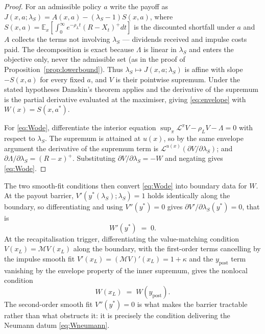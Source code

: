 \documentclass[11pt]{article}
\theoremstyle{remark}
\begin{document}
\begin{proof}
For an admissible policy $a$ write the payoff as
$J(x,a;\lambda_S) = A(x,a) - (\lambda_S-1)S(x,a)$, where
$S(x,a) = \mathbb{E}_x[\int_0^\infty e^{-\rho_L t}(R-X_t)^+dt]$ is the
discounted shortfall under $a$ and $A$ collects the terms not involving
$\lambda_S$ --- dividends received and impulse costs paid. The
decomposition is exact because $\Lambda$ is linear in $\lambda_S$ and
enters the objective only, never the admissible set (as in the proof of
Proposition~\ref{prop:lowerbound}). Thus $\lambda_S \mapsto J(x,a;\lambda_S)$
is affine with slope $-S(x,a)$ for every fixed $a$, and $V$ is their
pointwise supremum. Under the stated hypotheses Danskin's theorem applies
and the derivative of the supremum is the partial derivative evaluated at
the maximiser, giving \eqref{eq:envelope} with $W(x) = S(x,a^*)$.

For \eqref{eq:Wode}, differentiate the interior equation
$\sup_\pi \mathcal{L}^\pi V - \rho_L V - \Lambda = 0$ with respect to
$\lambda_S$. The supremum is attained at $u(x)$, so by the same envelope
argument the derivative of the supremum term is
$\mathcal{L}^{u(x)}(\partial V/\partial\lambda_S)$; and
$\partial\Lambda/\partial\lambda_S = (R-x)^+$. Substituting
$\partial V/\partial\lambda_S = -W$ and negating gives \eqref{eq:Wode}.
\end{proof}

\noindent
The two smooth-fit conditions then convert \eqref{eq:Wode} into boundary
data for $W$. At the payout barrier, $V'(y^*(\lambda_S);\lambda_S)=1$
holds identically along the boundary, so differentiating and using
$V''(y^*)=0$ gives $\partial V'/\partial\lambda_S(y^*)=0$, that is
\begin{equation}
W'(y^*) \;=\; 0 .
\label{eq:Wneumann}
\end{equation}
At the recapitalisation trigger, differentiating the value-matching
condition $V(x_L) = \mathcal{M}V(x_L)$ along the boundary, with the
first-order terms cancelling by the impulse smooth fit
$V'(x_L) = (\mathcal{M}V)'(x_L) = 1+\kappa$ and the $y_{\mathrm{post}}$
term vanishing by the envelope property of the inner supremum, gives the
nonlocal condition
\begin{equation}
W(x_L) \;=\; W(y_{\mathrm{post}}) .
\label{eq:Wnonlocal}
\end{equation}
The second-order smooth fit $V''(y^*)=0$ is what makes the barrier
tractable rather than what obstructs it: it is precisely the condition
delivering the Neumann datum \eqref{eq:Wneumann}.
\end{document}
